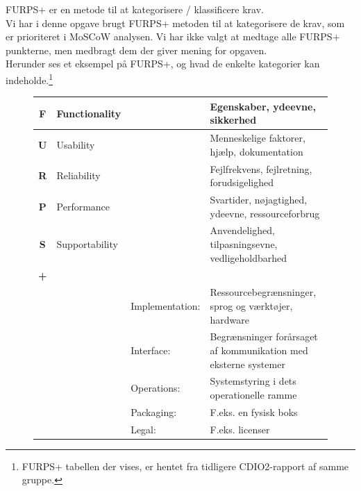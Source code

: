 FURPS+ er en metode til at kategorisere / klassificere krav. \\
Vi har i denne opgave brugt FURPS+ metoden til at kategorisere de krav, som er prioriteret i MoSCoW analysen.
Vi har ikke valgt at medtage alle FURPS+ punkterne, men medbragt dem der giver mening for opgaven. \\
Herunder ses et eksempel på FURPS+, og hvad de enkelte kategorier kan indeholde.\footnote{FURPS+ tabellen der vises, er hentet fra tidligere CDIO2-rapport af samme gruppe.}

\begin{figure}[ht]{
    \centering
\begin{tabular}{|c | p{} p{} |p{}|}
       \hline
       \textbf{F}   &   Functionality   &&
       Egenskaber, ydeevne, sikkerhed                   \\
       \hline

       \textbf{U}   &   Usability       &&
       Menneskelige faktorer, hjælp, dokumentation      \\
       \hline

       \textbf{R}   &   Reliability     &&
       Fejlfrekvens, fejlretning, forudsigelighed       \\
       \hline

       \textbf{P}   &   Performance     &&
       Svartider, nøjagtighed, ydeevne, ressourceforbrug                                                      \\
       \hline

       \textbf{S}   &   Supportability  &&
       Anvendelighed, tilpasningsevne, vedligeholdbarhed                                                      \\
       \hline

       \textbf{+}   &                   &&              \\

       &&   Implementation: &   Ressourcebegrænsninger, sprog og værktøjer, hardware                     \\

       &&   Interface:      &   Begrænsninger forårsaget af kommunikation med eksterne systemer              \\

       &&   Operations:     &   Systemstyring i dets operationelle ramme                              \\

       &&   Packaging:      &   F.eks. en fysisk boks   \\

       &&    Legal:         &   F.eks. licenser       \\
       \hline
\end{tabular}}
\end{figure}

